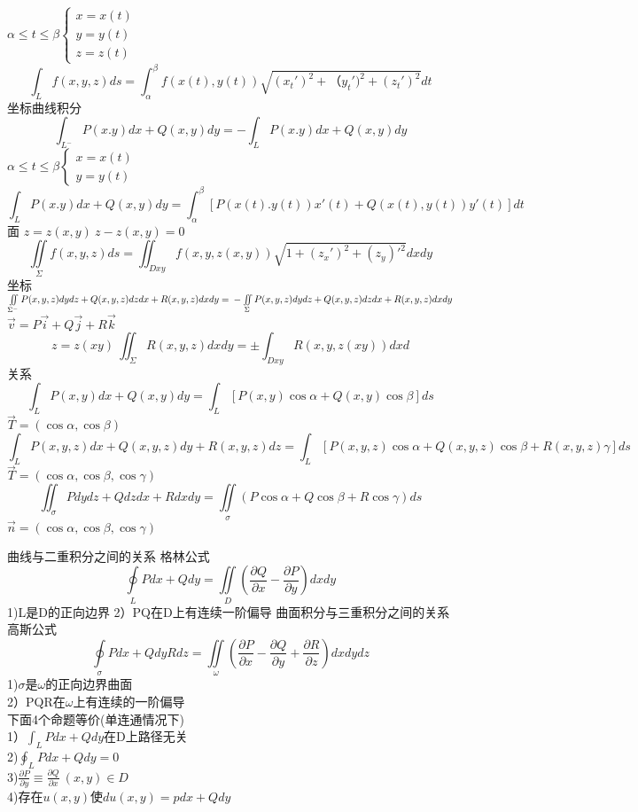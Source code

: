 		$\alpha\leqslant t\leqslant\beta\begin{cases}
		x=x(t)\\
		y=y(t)\\
		z=z(t)
	\end{cases}$
	$$\int_L f(x,y,z)ds=\int_\alpha^\beta f(x(t),y(t))\sqrt{(x_t')^2+（y_t')^2+(z_t')^2}dt$$
	坐标曲线积分
$$\int_{L^-}P(x.y)dx+Q(x,y)dy=-\int_LP(x.y)dx+Q(x,y)dy$$
		$\alpha\leqslant t\leqslant\beta\begin{cases}
		x=x(t)\\
		y=y(t)
	\end{cases}$
	$$\int_LP(x.y)dx+Q(x,y)dy=\int_\alpha^\beta\left[P(x(t).y(t))x'(t)+Q(x(t),y(t))y'(t)\right]dt$$
	面
	$z=z(x,y)\ z-z(x,y)=0$
	$$\iint\limits_\Sigma f(x,y,z)ds=\iint_{Dxy} f(x,y,z(x,y))\sqrt{1+(z_x')^2+(z_y)'^2}dxdy$$
	坐标
	$\iint\limits_{\Sigma^-} P(x,y,z)dydz+Q(x,y,z)dzdx +R(x,y,z)dxdy=\\
	-\iint\limits_\Sigma P(x,y,z)dydz+Q(x,y,z)dzdx +R(x,y,z)dxdy$\\
	$\overrightarrow{v}=P\overrightarrow{i}+Q\overrightarrow{j}+R\overrightarrow{k}$
	$$z=z(xy)\ \iint_\Sigma R(x,y,z)dxdy=\pm \int_{Dxy}R(x,y,z(xy))dxd$$
	关系
	$$\int_L P(x,y)dx+Q(x,y)dy=\int_L\left[P(x,y)\cos\alpha+Q(x,y)\cos\beta\right]ds$$
	$\overrightarrow{T}=(\cos\alpha,\cos\beta)$
		$$\int_L P(x,y,z)dx+Q(x,y,z)dy+R(x,y,z)dz=\int_L\left[P(x,y,z)\cos\alpha+Q(x,y,z)\cos\beta+R(x,y,z)\gamma\right]ds$$
	$\overrightarrow{T}=(\cos\alpha,\cos\beta,\cos\gamma)$
	$$\iint_\sigma Pdydz+Qdzdx+Rdxdy=\iint\limits_\sigma\left(P\cos\alpha+Q\cos\beta+R\cos\gamma\right)ds$$
	$\overrightarrow{n}=(\cos\alpha,\cos\beta,\cos\gamma)$
	
曲线与二重积分之间的关系
格林公式
$$\oint\limits_L Pdx+Qdy=\iint\limits_D\left(\frac{\partial Q}{\partial x}-\frac{\partial P}{\partial y}\right)dxdy$$
1)L是D的正向边界
2）PQ在D上有连续一阶偏导
曲面积分与三重积分之间的关系
高斯公式
$$\oint\limits_\sigma Pdx+Qdy Rdz=\iint\limits_\omega\left(\frac{\partial P}{\partial x}-\frac{\partial Q}{\partial y}+\frac{\partial R}{\partial z}\right)dxdydz$$
1)$\sigma$是$\omega$的正向边界曲面\\
2）PQR在$\omega$上有连续的一阶偏导\\
下面4个命题等价(单连通情况下)\\
1）$\int_L Pdx+Qdy$在D上路径无关\\
2)$\oint_LPdx+Qdy=0$\\
3)$\frac{\partial P}{\partial y}\equiv\frac{\partial Q}{\partial x}\ (x,y)\in D$\\
4)存在$u(x,y)$使$du(x,y)=pdx+Qdy$